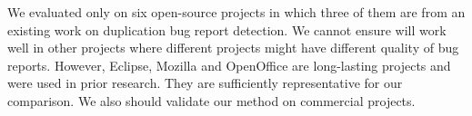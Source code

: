 


\vspace{0.04in}
  We evaluated only on six
open-source projects in which three of them are from an existing work
on duplication bug report detection. We cannot ensure {\model} will
work well in other projects where different projects might have
different quality of bug reports.  However, Eclipse, Mozilla and
OpenOffice are long-lasting projects and were used in prior
research. They are sufficiently representative for our comparison. We
also should validate our method on commercial projects.

%







